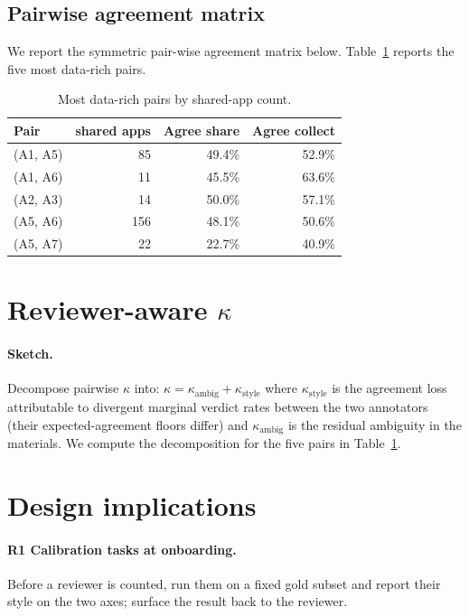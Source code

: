 \documentclass[11pt,a4paper]{article}
\begin{document}
\subsection{Pairwise agreement matrix}
We report the symmetric pair-wise agreement matrix below.
Table~\ref{tab:pairwise} reports the five most data-rich pairs.

\begin{table}[t]
\centering\small
\caption{Most data-rich pairs by shared-app count.}
\label{tab:pairwise}
\begin{tabular}{lrrr}
\toprule
Pair & shared apps & Agree share & Agree collect \\
\midrule
(A1, A5) & 85  & 49.4\% & 52.9\% \\
(A1, A6) & 11  & 45.5\% & 63.6\% \\
(A2, A3) & 14  & 50.0\% & 57.1\% \\
(A5, A6) & 156 & 48.1\% & 50.6\% \\
(A5, A7) & 22  & 22.7\% & 40.9\% \\
\bottomrule
\end{tabular}
\end{table}

\section{Reviewer-aware \texorpdfstring{$\kappa$}{kappa}}
\paragraph{Sketch.} Decompose pairwise $\kappa$ into:
$\kappa = \kappa_{\text{ambig}} + \kappa_{\text{style}}$
where $\kappa_{\text{style}}$ is the agreement loss attributable to
divergent marginal verdict rates between the two annotators (their
expected-agreement floors differ) and $\kappa_{\text{ambig}}$ is the
residual ambiguity in the materials. We compute the decomposition for the
five pairs in Table~\ref{tab:pairwise}.

\section{Design implications}
\paragraph{R1 Calibration tasks at onboarding.} Before a reviewer is
counted, run them on a fixed gold subset and report their style on the
two axes; surface the result back to the reviewer.
\end{document}
